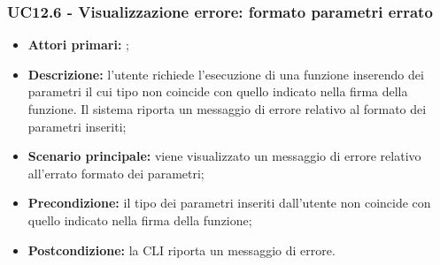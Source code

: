 \subsubsection{UC12.6 - Visualizzazione errore: formato parametri errato}
\begin{itemize}
	\item \textbf{Attori primari:} \ua{};
	\item \textbf{Descrizione:} l’utente richiede l’esecuzione di una funzione inserendo dei parametri il cui tipo non coincide con quello indicato nella firma della funzione. Il sistema riporta un messaggio di errore relativo al formato dei parametri inseriti;
	\item \textbf{Scenario principale:} viene visualizzato un messaggio di errore relativo all'errato formato dei parametri;
	\item \textbf{Precondizione:} il  tipo dei parametri inseriti dall'utente non coincide con quello indicato nella firma della funzione; 
	\item \textbf{Postcondizione:} la CLI riporta un messaggio di errore.
\end{itemize}